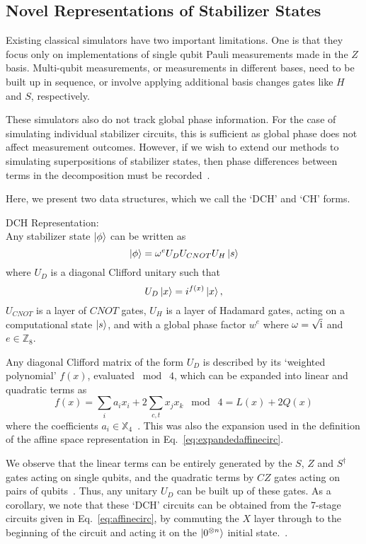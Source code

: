 \subsection{Novel Representations of Stabilizer States}
Existing classical simulators have two important limitations. One is that they focus only on implementations of single qubit Pauli measurements made in the $Z$ basis. Multi-qubit measurements, or measurements in different bases, need to be built up in sequence, or involve applying additional basis changes gates like $H$ and $S$, respectively.\par
These simulators also do not track global phase information. For the case of simulating individual stabilizer circuits, this is sufficient as global phase does not affect measurement outcomes. However, if we wish to extend our methods to simulating superpositions of stabilizer states, then phase differences between terms in the decomposition must be recorded~\cite{Garcia2015}.\par
Here, we present two data structures, which we call the `DCH' and `CH' forms.
\begin{defn}
DCH Representation:\\
Any stabilizer state $\ket{\phi}$ can be written as
\begin{equation}\ket{\phi} = \omega^{e}U_{D} U_{CNOT} U_{H} \ket{s}
\label{eq:dch}
\end{equation}
where $U_{D}$ is a diagonal Clifford unitary such that
\[
U_{D}\ket{x} = i^{f(x)}\ket{x},
\]
$U_{CNOT}$ is a layer of $CNOT$ gates, $U_{H}$ is a layer of Hadamard gates, acting on a computational state $\ket{s}$, and with a global phase factor $w^{e}$ where $\omega=\sqrt{\mathrm{i}}$ and $e\in\mathbb{Z}_{8}$.\label{def:dch}
\end{defn}
Any diagonal Clifford matrix of the form $U_{D}$ is described by its `weighted polynomial' $f(x)$, evaluated $\bmod\; 4$, which can be expanded into linear and quadratic terms as
\[
    f(x) = \sum_{i}a_{i}x_{i} + 2\sum_{c,t}x_{j}x_{k}\;\bmod\;4 = L(x) + 2Q(x)
\]
where the coefficients $a_{i}\in\mathbb{X}_{4}$~\cite{VandenNest2008,Campbell2016}. This was also the expansion used in the definition of the affine space representation in Eq.~\ref{eq:expandedaffinecirc}.\par
We observe that the linear terms can be entirely generated by the $S$, $Z$ and $S^{\dagger}$ gates acting on single qubits, and the quadratic terms by $CZ$ gates acting on pairs of qubits~\cite{Campbell2016}. Thus, any unitary $U_{D}$ can be built up of these gates. As a corollary, we note that these `DCH' circuits can be obtained from the 7-stage circuits given in Eq.~\ref{eq:affinecirc}, by commuting the $X$ layer through to the beginning of the circuit and acting it on the $\ket{0^{\otimes n}}$ initial state.~\cite{VandenNest2008}.\par
